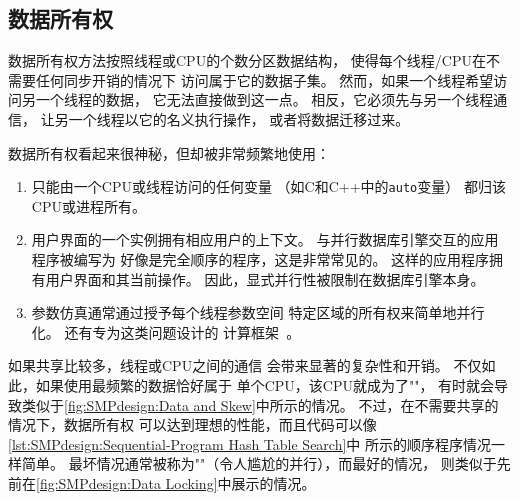 \subsection{数据所有权}
\label{sec:SMPdesign:Data Ownership}

数据所有权方法按照线程或CPU的个数分区数据结构，
使得每个线程/CPU在不需要任何同步开销的情况下
访问属于它的数据子集。
然而，如果一个线程希望访问另一个线程的数据，
它无法直接做到这一点。
相反，它必须先与另一个线程通信，
让另一个线程以它的名义执行操作，
或者将数据迁移过来。

数据所有权看起来很神秘，但却被非常频繁地使用：
\begin{enumerate}
\item	只能由一个CPU或线程访问的任何变量
	（如C和C++中的{\tt auto}变量）
	都归该CPU或进程所有。
\item	用户界面的一个实例拥有相应用户的上下文。
	与并行数据库引擎交互的应用程序被编写为
	好像是完全顺序的程序，这是非常常见的。
	这样的应用程序拥有用户界面和其当前操作。
	因此，显式并行性被限制在数据库引擎本身。
\item	参数仿真通常通过授予每个线程参数空间
	特定区域的所有权来简单地并行化。
	还有专为这类问题设计的
	计算框架~\cite{BOINC2008}。
\end{enumerate}

如果共享比较多，线程或CPU之间的通信
会带来显著的复杂性和开销。
不仅如此，如果使用最频繁的数据恰好属于
单个CPU，该CPU就成为了""，
有时就会导致类似于\cref{fig:SMPdesign:Data and Skew}中所示的情况。
不过，在不需要共享的情况下，数据所有权
可以达到理想的性能，而且代码可以像
\cref{lst:SMPdesign:Sequential-Program Hash Table Search}中
所示的顺序程序情况一样简单。
最坏情况通常被称为""（令人尴尬的并行），而最好的情况，
则类似于先前在\cref{fig:SMPdesign:Data Locking}中展示的情况。



